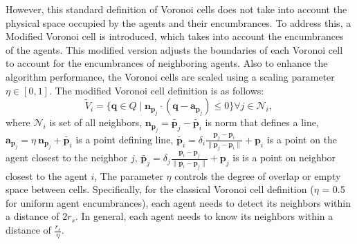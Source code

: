         However, this standard definition of Voronoi cells does not take into account the physical space occupied by the agents and their encumbrances. 
        To address this, a Modified Voronoi cell is introduced, which takes into account the encumbrances of the agents.
        This modified version adjusts the boundaries of each Voronoi cell to account for the encumbrances of neighboring agents.
        Also to enhance the algorithm performance, the Voronoi cells are scaled using a scaling parameter $\eta \in [0, 1]$.
        The modified Voronoi cell definition is as follows:
        \begin{equation}
            \label{eqn:voronoi_cell_account_encum}
            \tilde{V}_i = \{ \mathbf{q} \in Q \mid \mathbf{n}_{\mathbf{p}_j} \cdot (\mathbf{q} - \mathbf{a}_{\mathbf{p}_j}) \leq 0 \} \forall j \in \mathcal{N}_i \text{, }
        \end{equation}
        where $\mathcal{N}_i$ is set of all neighbors, $\mathbf{n}_{\mathbf{p}_j} = \tilde{\mathbf{p}_{j}} - \tilde{\mathbf{p}_{i}}$ is norm that defines a line, 
        $\mathbf{a}_{\mathbf{p}_{j}} = \eta \ \mathbf{n}_{\mathbf{p}_j} + \tilde{\mathbf{p}_{i}}$ is a point defining line,
        $\tilde{\mathbf{p}_{i}} = \delta_{i}\frac{\mathbf{p}_{j} - \mathbf{p}_{i}}{\| \mathbf{p}_{j} - \mathbf{p}_{i} \|} + \mathbf{p}_i$ is a point on the agent closest to the neighbor $j$,
        $\tilde{\mathbf{p}_{j}} = \delta_{j}\frac{\mathbf{p}_{i} - \mathbf{p}_{j}}{\| \mathbf{p}_{i} - \mathbf{p}_{j} \|} + \mathbf{p}_{j}$ is is a point on neighbor closest to the agent $i$,
        The parameter $\eta$ controls the degree of overlap or empty space between cells.
        Specifically, for the classical Voronoi cell definition ($\eta$ = 0.5 for uniform agent encumbrances), each agent needs to detect its neighbors within a distance of $2r_{s}$.
        In general, each agent needs to know its neighbors within a distance of $\frac{r_s}{\eta}$.

